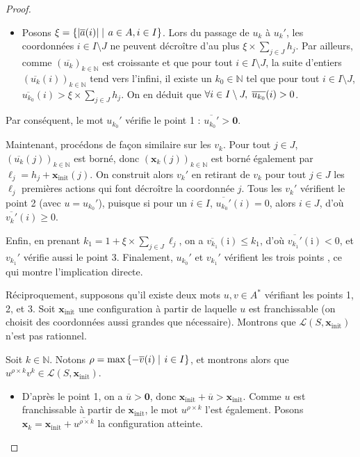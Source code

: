 \documentclass[a4paper,final]{article}
\theoremstyle{definition}
\let\leq\leqslant
\let\geq\geqslant
\newcommand{\set}[2]{\left\{#1\mathrel{\left|\vphantom{#1}\vphantom{#2}\right.}#2\right\}}
\newcommand{\abs}[1]{\ensuremath{\displaystyle\left\lvert #1 \right\rvert}}
\newcommand{\N}{\ensuremath{\mathbb{N}}}
\newcommand{\lang}{\ensuremath{\mathcal{L}}}
\newcommand{\vect}[1]{\ensuremath{\mathbf{#1}}}
\newcommand{\xinit}{\ensuremath{\vect{x}_\text{init}}}
\newcommand{\valeur}[1]{\ensuremath{\overline{#1}}}
\begin{document}
\begin{proof}
\begin{itemize}
    \item Posons $\xi = \set{\abs{\valeur{a}(i)}} {a\in A,i\in I}$.
    Lors du passage de $u_k$ à $u_k'$, les coordonnées $i\in I\setminus J$ ne peuvent décroître d'au plus $\xi \times \sum_{j\in J} h_j$.
    Par ailleurs, comme $(\valeur{u_k})_{k\in\N}$ est croissante et que pour tout $i\in I\setminus J$, la suite d'entiers $(\valeur{u_k}(i))_{k\in\N}$ tend vers l'infini, 
    il existe un $k_0\in\N$ tel que pour tout $i\in I\setminus J$, $\valeur{u_{k_0}}(i) > \xi \times \sum_{j\in J} h_j$.
    On en déduit que $\forall i\in I\setminus J, \hspace{1mm} \valeur{u_{k_0}}(i) > 0$.
\end{itemize}
Par conséquent, le mot $u_{k_0}'$ vérifie le point 1 %
: $\valeur{u_{k_0}'} > \vect{0}$.
\vspace{2mm}

Maintenant, procédons de façon similaire sur les $v_k$.
Pour tout $j\in J$, $(\valeur{u_k}(j))_{k\in\N}$ est borné, donc $(\vect{x}_k(j))_{k\in\N}$ est borné également par $\ell_j = h_j + \xinit(j)$.
On construit alors $v_k'$ en retirant de $v_k$ pour tout $j\in J$ les $\ell_j$ premières actions qui font décroître la coordonnée $j$.
Tous les $v_k'$ vérifient le point 2 (avec $u = u_{k_0}'$), puisque si pour un $i\in I$, $\valeur{u_{k_0}'}(i) = 0$, alors $i\in J$, d'où $\valeur{v_k'}(i) \geq 0$.

Enfin, en prenant $k_1 = 1 + \xi \times \sum_{j\in J} \ell_j$, on a $\valeur{v_{k_1}}(\mathrm{i}) \leq k_1$, d'où $\valeur{v_{k_1}'}(\mathrm{i}) < 0$, et $v_{k_1}'$ vérifie aussi le point 3.
Finalement, $u_{k_0}'$ et $v_{k_1}'$ vérifient les trois points %
, ce qui montre l'implication directe.
\vspace{5mm}

Réciproquement, supposons qu'il existe deux mots $u,v\in A^*$ vérifiant les points 1, 2, et 3.
Soit $\xinit$ une configuration à partir de laquelle $u$ est franchissable (on choisit des coordonnées aussi grandes que nécessaire).
Montrons que $\lang(S,\xinit)$ n'est pas rationnel.

Soit $k\in\N$.
Notons $\rho = \text{max}\set{-\valeur{v}(i)}{i\in I}$, 
et montrons alors que $u^{\rho\times k} v^k \in \lang(S,\xinit)$.

\begin{itemize}
    \item D'après le point 1, on a $\valeur{u} > \vect{0}$, donc $\xinit + \valeur{u} > \xinit$.
    Comme $u$ est franchissable à partir de $\xinit$, le mot $u^{\rho\times k}$ l'est également.
    Posons $\vect{x}_k = \xinit + \valeur{u^{\rho\times k}}$ la configuration atteinte.
    

\end{itemize}
\end{proof}
\end{document}
